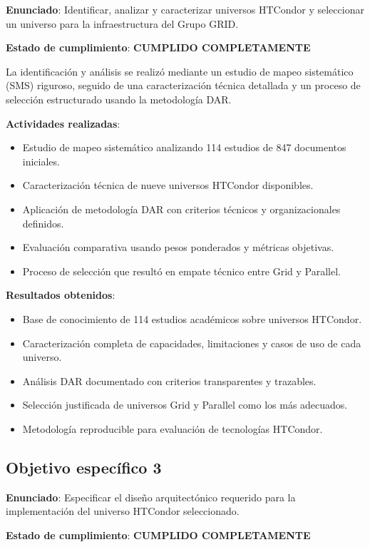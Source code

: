\textbf{Enunciado}: Identificar, analizar y caracterizar universos HTCondor y seleccionar un universo para la infraestructura del Grupo GRID.

\textbf{Estado de cumplimiento}: \textbf{CUMPLIDO COMPLETAMENTE}

La identificación y análisis se realizó mediante un estudio de mapeo sistemático (SMS) riguroso, seguido de una caracterización técnica detallada y un proceso de selección estructurado usando la metodología DAR.

\textbf{Actividades realizadas}:
\begin{itemize}
    \item Estudio de mapeo sistemático analizando 114 estudios de 847 documentos iniciales.
    \item Caracterización técnica de nueve universos HTCondor disponibles.
    \item Aplicación de metodología DAR con criterios técnicos y organizacionales definidos.
    \item Evaluación comparativa usando pesos ponderados y métricas objetivas.
    \item Proceso de selección que resultó en empate técnico entre Grid y Parallel.
\end{itemize}

\textbf{Resultados obtenidos}:
\begin{itemize}
    \item Base de conocimiento de 114 estudios académicos sobre universos HTCondor.
    \item Caracterización completa de capacidades, limitaciones y casos de uso de cada universo.
    \item Análisis DAR documentado con criterios transparentes y trazables.
    \item Selección justificada de universos Grid y Parallel como los más adecuados.
    \item Metodología reproducible para evaluación de tecnologías HTCondor.
\end{itemize}

\subsection{Objetivo específico 3}
\noindent

\textbf{Enunciado}: Especificar el diseño arquitectónico requerido para la implementación del universo HTCondor seleccionado.

\textbf{Estado de cumplimiento}: \textbf{CUMPLIDO COMPLETAMENTE}

